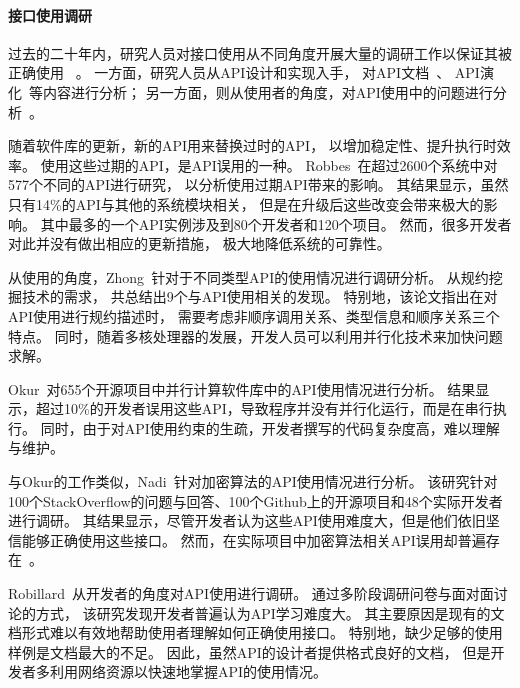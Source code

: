 \paragraph{接口使用调研}
过去的二十年内，研究人员对接口使用从不同角度开展大量的调研工作以保证其被正确使用
~\cite{16-icse-cry,17-tse-survey, 12-fse-parallel,12-fse-deprecation,	18-sqj-evolution,11-etaps-doc, 15-ese-evolution, 11-ese-learning, 15-tse-change,13-etaps-mapping}。
一方面，研究人员从API设计和实现入手，
对API文档~\cite{12-fse-deprecation, 18-sqj-evolution,11-etaps-doc}、
API演化~\cite{15-ese-evolution,15-tse-change}等内容进行分析；
另一方面，则从使用者的角度，对API使用中的问题进行分析~\cite{16-icse-cry,17-tse-survey,12-fse-parallel,11-ese-learning,13-etaps-mapping}。

随着软件库的更新，新的API用来替换过时的API，
以增加稳定性、提升执行时效率。
使用这些过期的API，是API误用的一种。
Robbes~\cite{12-fse-deprecation, 18-sqj-evolution}在超过2600个系统中对577个不同的API进行研究，
以分析使用过期API带来的影响。
其结果显示，虽然只有14\%的API与其他的系统模块相关，
但是在升级后这些改变会带来极大的影响。
其中最多的一个API实例涉及到80个开发者和120个项目。
然而，很多开发者对此并没有做出相应的更新措施，
极大地降低系统的可靠性。

从使用的角度，Zhong~\cite{17-tse-survey}针对于不同类型API的使用情况进行调研分析。
从规约挖掘技术的需求，
共总结出9个与API使用相关的发现。
特别地，该论文指出在对API使用进行规约描述时，
需要考虑非顺序调用关系、类型信息和顺序关系三个特点。
同时，随着多核处理器的发展，开发人员可以利用并行化技术来加快问题求解。

Okur~\cite{12-fse-parallel}对655个开源项目中并行计算软件库中的API使用情况进行分析。
结果显示，超过10\%的开发者误用这些API，导致程序并没有并行化运行，而是在串行执行。
同时，由于对API使用约束的生疏，开发者撰写的代码复杂度高，难以理解与维护。

与Okur的工作类似，Nadi~\cite{16-icse-cry}针对加密算法的API使用情况进行分析。
该研究针对100个StackOverflow的问题与回答、100个Github上的开源项目和48个实际开发者进行调研。
其结果显示，尽管开发者认为这些API使用难度大，但是他们依旧坚信能够正确使用这些接口。
然而，在实际项目中加密算法相关API误用却普遍存在~\cite{13-ccs-misuse}。

Robillard~\cite{11-ese-learning}从开发者的角度对API使用进行调研。
通过多阶段调研问卷与面对面讨论的方式，
该研究发现开发者普遍认为API学习难度大。
其主要原因是现有的文档形式难以有效地帮助使用者理解如何正确使用接口。
特别地，缺少足够的使用样例是文档最大的不足。
因此，虽然API的设计者提供格式良好的文档，
但是开发者多利用网络资源以快速地掌握API的使用情况。

